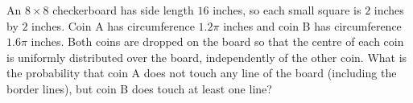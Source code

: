 An $8\times8$ checkerboard has side length $16$ inches, so each small square is $2$ inches by $2$ inches. Coin A has circumference $1.2\pi$ inches and coin B has circumference $1.6\pi$ inches. Both coins are dropped on the board so that the centre of each coin is uniformly distributed over the board, independently of the other coin. What is the probability that coin A does not touch any line of the board (including the border lines), but coin B does touch at least one line?
